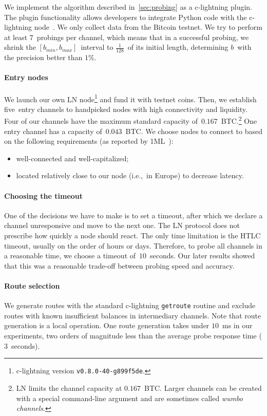 We implement the algorithm described in~\cref{sec:probing} as a c-lightning plugin.
The plugin functionality allows developers to integrate Python code with the c-lightning node~\cite{clightningPlugins}.
We only collect data from the Bitcoin testnet.
We try to perform at least $7$~probings per channel, which means that in a successful probing, we shrink the $[b_{min}, b_{max}]$~interval to $\frac{1}{128}$~of its initial length, determining $b$~with the precision better than $1\%$.

\paragraph{Entry nodes}
We launch our own LN node\footnote{c-lightning version \texttt{v0.8.0-40-g899f5de}.} and fund it with testnet coins.
Then, we establish five~entry channels to handpicked nodes with high connectivity and liquidity.
Four of our channels have the maximum standard capacity of~$0.167$~BTC\@.\footnote{LN limits the channel capacity at $0.167$~BTC\@. Larger channels can be created with a special command-line argument and are sometimes called \textit{wumbo channels}.}
One entry channel has a capacity of~$0.043$~BTC\@.
We choose nodes to connect to based on the following requirements (as reported by 1ML~\cite{1MLTopConnected}):
\begin{itemize}
	\item well-connected and well-capitalized;
	\item located relatively close to our node (i.e.,~in Europe) to decrease latency.
\end{itemize}

\paragraph{Choosing the timeout}
One of the decisions we have to make is to set a timeout, after which we declare a channel unresponsive and move to the next one.
The LN protocol does not prescribe how quickly a node should react.
The only time limitation is the HTLC timeout, usually on the order of hours or days.
Therefore, to probe all channels in a reasonable time, we choose a timeout of~$10$~seconds.
Our later results showed that this was a reasonable trade-off between probing speed and accuracy.

\paragraph{Route selection}
We generate routes with the standard c-lightning \texttt{getroute} routine and exclude routes with known insufficient balances in intermediary channels.
Note that route generation is a local operation.
One route generation takes under $10$~ms in our experiments, two orders of magnitude less than the average probe response time ($3$~seconds).

